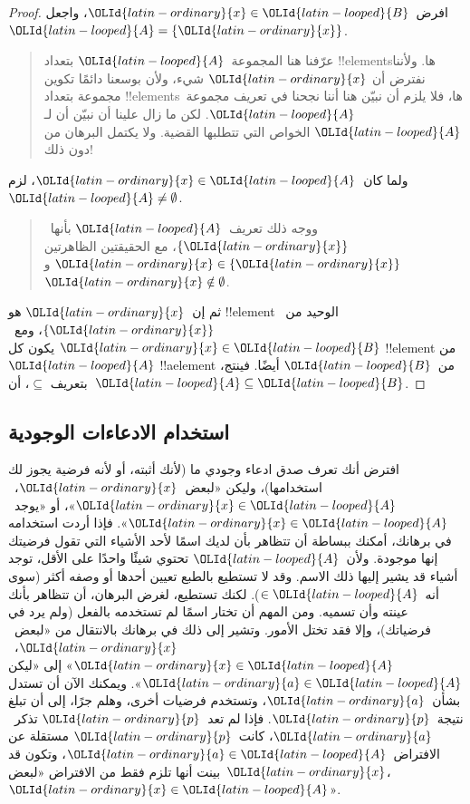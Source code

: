 \documentclass[../../../include/open-logic-section]{subfiles}
\begin{document}
\begin{proof}
  افرض~${\OLId{latin-ordinary}{x}} \in {\OLId{latin-looped}{B}}$، واجعل~${\OLId{latin-looped}{A}} = \{{\OLId{latin-ordinary}{x}}\}$.
  \begin{quote}
    عرّفنا هنا المجموعة~${\OLId{latin-looped}{A}}$ بتعداد !!{element}sها. ولأننا نفترض أن
    ${\OLId{latin-ordinary}{x}}$ شيء، ولأن بوسعنا دائمًا تكوين مجموعة بتعداد !!{element}sها،
    فلا يلزم أن نبيّن هنا أننا نجحنا في تعريف مجموعة~${\OLId{latin-looped}{A}}$. لكن ما زال
    علينا أن نبيّن أن لـ${\OLId{latin-looped}{A}}$ الخواص التي تتطلبها القضية. ولا يكتمل
    البرهان من دون ذلك!{}
  \end{quote}
  ولما كان~${\OLId{latin-ordinary}{x}} \in {\OLId{latin-looped}{A}}$، لزم~${\OLId{latin-looped}{A}} \neq \emptyset$.
  \begin{quote}
    ووجه ذلك تعريف~${\OLId{latin-looped}{A}}$ بأنها~$\{{\OLId{latin-ordinary}{x}}\}$، مع الحقيقتين الظاهرتين
    ${\OLId{latin-ordinary}{x}} \in \{{\OLId{latin-ordinary}{x}}\}$ و${\OLId{latin-ordinary}{x}} \notin \emptyset$.
  \end{quote}
  ثم إن~${\OLId{latin-ordinary}{x}}$ هو !!{element} الوحيد من~$\{{\OLId{latin-ordinary}{x}}\}$، ومع~${\OLId{latin-ordinary}{x}} \in {\OLId{latin-looped}{B}}$ يكون كل
  !!{element} من~${\OLId{latin-looped}{A}}$ !!a{element} من~${\OLId{latin-looped}{B}}$ أيضًا. فينتج، بتعريف
  $\subseteq$، أن~${\OLId{latin-looped}{A}} \subseteq {\OLId{latin-looped}{B}}$.
\end{proof}

\subsection{استخدام الادعاءات الوجودية}

افترض أنك تعرف صدق ادعاء وجودي ما (لأنك أثبته، أو لأنه فرضية يجوز لك
استخدامها)، وليكن «لبعض~${\OLId{latin-ordinary}{x}}$،~${\OLId{latin-ordinary}{x}} \in {\OLId{latin-looped}{A}}$»، أو «يوجد~${\OLId{latin-ordinary}{x}} \in {\OLId{latin-looped}{A}}$». فإذا
أردت استخدامه في برهانك، أمكنك ببساطة أن تتظاهر بأن لديك اسمًا لأحد
الأشياء التي تقول فرضيتك إنها موجودة. ولأن~${\OLId{latin-looped}{A}}$ تحتوي شيئًا واحدًا على
الأقل، توجد أشياء قد يشير إليها ذلك الاسم. وقد لا تستطيع بالطبع
تعيين أحدها أو وصفه أكثر (سوى أنه~$\in {\OLId{latin-looped}{A}}$). لكنك تستطيع، لغرض
البرهان، أن تتظاهر بأنك عينته وأن تسميه. ومن المهم أن تختار اسمًا لم
تستخدمه بالفعل (ولم يرد في فرضياتك)، وإلا فقد تختل الأمور. وتشير إلى
ذلك في برهانك بالانتقال من «لبعض~${\OLId{latin-ordinary}{x}}$،~${\OLId{latin-ordinary}{x}} \in {\OLId{latin-looped}{A}}$» إلى «ليكن
${\OLId{latin-ordinary}{a}} \in {\OLId{latin-looped}{A}}$». ويمكنك الآن أن تستدل بشأن~${\OLId{latin-ordinary}{a}}$، وتستخدم فرضيات أخرى، وهلم
جرًا، إلى أن تبلغ نتيجة~${\OLId{latin-ordinary}{p}}$. فإذا لم تعد~${\OLId{latin-ordinary}{p}}$ تذكر~${\OLId{latin-ordinary}{a}}$، كانت~${\OLId{latin-ordinary}{p}}$
مستقلة عن الافتراض~${\OLId{latin-ordinary}{a}} \in {\OLId{latin-looped}{A}}$، وتكون قد بينت أنها تلزم فقط من الافتراض
«لبعض~${\OLId{latin-ordinary}{x}}$،~${\OLId{latin-ordinary}{x}} \in {\OLId{latin-looped}{A}}$».
\end{document}

